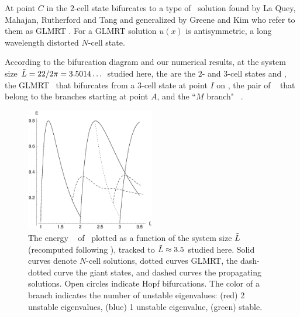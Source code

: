 At point $C$ in 
the $2$-cell state bifurcates to a type of
\eqv\ solution
found by La Quey, Mahajan, Rutherford and Tang 
and generalized by Greene and Kim who refer to them as GLMRT \eqva.
For a GLMRT solution $u(x)$ is antisymmetric,
a long wavelength distorted $N$-cell state.


According to the bifurcation diagram
and our numerical results,
at the system size $\tilde{L}=22/2\pi = 3.5014\dots$
studied here,
the {\eqva} are the $2$- and $3$-cell states  and ,
the GLMRT \eqv\ that bifurcates from a $3$-cell state at point $I$
on ,
the pair of \reqva\  
that belong to the branches starting at point
$A$,
and the ``$M$ branch"  \reqva\ .

\begin{figure}[t]       \label{fig:ksBifDiag}
\begin{center}
\includegraphics[width=0.5\textwidth]{figs/ksBifDiag.eps}
\end{center}
\caption{
The energy \expctE\    of \eqva\
plotted as a function of the system size
$\tilde{L}$ (recomputed following ), tracked to
$\tilde{L} \approx 3.5$ studied here.
Solid curves denote $N$-cell solutions,
dotted curves GLMRT, the dash-dotted curve the
giant states, and dashed curves the propagating solutions.
Open circles indicate Hopf bifurcations.
The color of a branch indicates the number of unstable
eigenvalues: (red) 2 unstable eigenvalues, (blue) 1
unstable eigenvalue, (green) stable.
        }
\end{figure}

